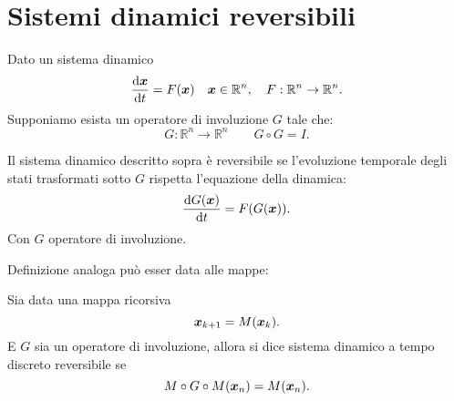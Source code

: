 \section*{Sistemi dinamici reversibili}%
Dato un sistema dinamico 
\[
    \frac{\text{d} \boldsymbol{x}}{\text{d} t} = F(\boldsymbol{x}) \quad  \boldsymbol{x}\in \mathbb{R}^n, \quad  F:\mathbb{R}^n\to \mathbb{R}^n
.\] 
Supponiamo esista un operatore di involuzione $G$  tale che:
\[
    G:\mathbb{R}^n\to \mathbb{R}^n \qquad  G \circ G = I
.\]
\begin{defn}
    Il sistema dinamico descritto sopra è reversibile se l'evoluzione temporale degli stati trasformati sotto $G$  rispetta l'equazione della dinamica:
    \[
	\frac{\text{d} G(\boldsymbol{x}) }{\text{d} t} = F(G(\boldsymbol{x}) ) 
    .\] 
    Con $G$ operatore di involuzione.
\end{defn}
\noindent
Definizione analoga può esser data alle mappe:
\begin{defn}
    Sia data una mappa ricorsiva
    \[
	\boldsymbol{x}_{k+1} = M(\boldsymbol{x}_k) 
    .\] 
    E $G$ sia un operatore di involuzione, allora si dice sistema dinamico a tempo discreto reversibile se 
    \[
	M \circ G \circ M (\boldsymbol{x}_n) = M(\boldsymbol{x}_n) 
    .\] 
\end{defn}
\noindent
